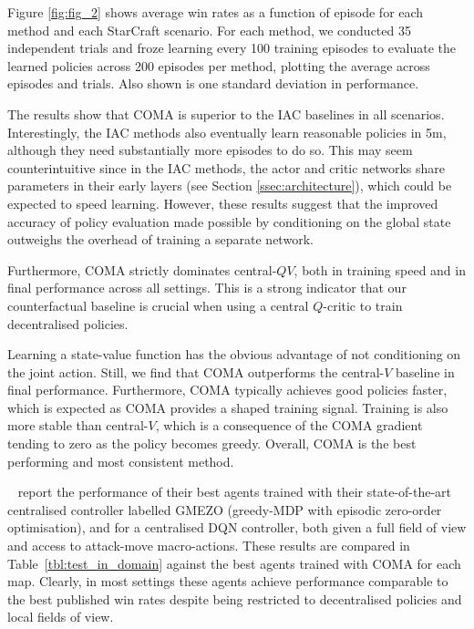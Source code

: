 \documentclass[letterpaper]{article}
\newcommand{\citet}[1]{\citeauthor{#1}~\shortcite{#1}}
\begin{document}
Figure \ref{fig:fig_2} shows average win rates as a function of episode
for each method and each StarCraft scenario. For each method, we conducted 35
independent trials and froze learning every 100 training episodes to evaluate
the learned policies across 200 episodes per method, plotting the average across
episodes and trials. Also shown is one standard deviation in performance.

The results show that COMA is superior to the IAC baselines in all scenarios. Interestingly, the IAC methods also eventually learn reasonable policies in
5m, although they need substantially more episodes to do so. This may seem
counterintuitive since in the IAC methods, the actor and critic networks share
parameters in their early layers (see Section
\ref{ssec:architecture}), which could be expected to speed learning. However, these 
results suggest that the improved accuracy of policy evaluation made 
possible by conditioning on the global state outweighs the overhead of training 
a separate network.

Furthermore, COMA strictly dominates \mbox{central-$QV$}, both in training 
speed and in final performance across all settings. This is a strong indicator 
that our counterfactual baseline is crucial when using a central $Q$-critic to 
train decentralised policies.

Learning a state-value function has the obvious advantage of not conditioning 
on the joint action. Still, we find that COMA outperforms the 
\mbox{central-$V$} baseline in final performance. Furthermore, COMA typically achieves good 
policies faster, which is expected as COMA provides a shaped training signal. 
Training is also more stable  than \mbox{central-$V$}, which is a consequence of the COMA gradient 
tending to zero as the policy becomes greedy. Overall, COMA is the best 
performing and most consistent method.

\citet{usunier2016episodic} report the performance of their best agents trained with their 
state-of-the-art centralised controller labelled GMEZO (greedy-MDP with 
episodic zero-order optimisation), and for a centralised DQN controller, both 
given a full field of view and access to attack-move macro-actions. These 
results are compared in Table~\ref{tbl:test_in_domain} against the best agents 
trained with COMA for each map. Clearly, in most settings these agents achieve 
performance comparable to the best published win rates despite being 
restricted to decentralised policies and local fields of view.
\end{document}
